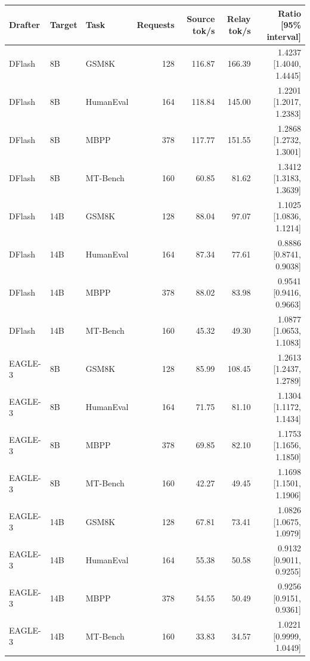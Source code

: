 \begin{tabular}{lllrrrr}
\toprule
Drafter & Target & Task & Requests & Source tok/s & Relay tok/s & Ratio [95\% interval] \\
\midrule
DFlash & 8B & GSM8K & 128 & 116.87 & 166.39 & 1.4237 [1.4040, 1.4445] \\
DFlash & 8B & HumanEval & 164 & 118.84 & 145.00 & 1.2201 [1.2017, 1.2383] \\
DFlash & 8B & MBPP & 378 & 117.77 & 151.55 & 1.2868 [1.2732, 1.3001] \\
DFlash & 8B & MT-Bench & 160 & 60.85 & 81.62 & 1.3412 [1.3183, 1.3639] \\
DFlash & 14B & GSM8K & 128 & 88.04 & 97.07 & 1.1025 [1.0836, 1.1214] \\
DFlash & 14B & HumanEval & 164 & 87.34 & 77.61 & 0.8886 [0.8741, 0.9038] \\
DFlash & 14B & MBPP & 378 & 88.02 & 83.98 & 0.9541 [0.9416, 0.9663] \\
DFlash & 14B & MT-Bench & 160 & 45.32 & 49.30 & 1.0877 [1.0653, 1.1083] \\
EAGLE-3 & 8B & GSM8K & 128 & 85.99 & 108.45 & 1.2613 [1.2437, 1.2789] \\
EAGLE-3 & 8B & HumanEval & 164 & 71.75 & 81.10 & 1.1304 [1.1172, 1.1434] \\
EAGLE-3 & 8B & MBPP & 378 & 69.85 & 82.10 & 1.1753 [1.1656, 1.1850] \\
EAGLE-3 & 8B & MT-Bench & 160 & 42.27 & 49.45 & 1.1698 [1.1501, 1.1906] \\
EAGLE-3 & 14B & GSM8K & 128 & 67.81 & 73.41 & 1.0826 [1.0675, 1.0979] \\
EAGLE-3 & 14B & HumanEval & 164 & 55.38 & 50.58 & 0.9132 [0.9011, 0.9255] \\
EAGLE-3 & 14B & MBPP & 378 & 54.55 & 50.49 & 0.9256 [0.9151, 0.9361] \\
EAGLE-3 & 14B & MT-Bench & 160 & 33.83 & 34.57 & 1.0221 [0.9999, 1.0449] \\
\bottomrule
\end{tabular}
